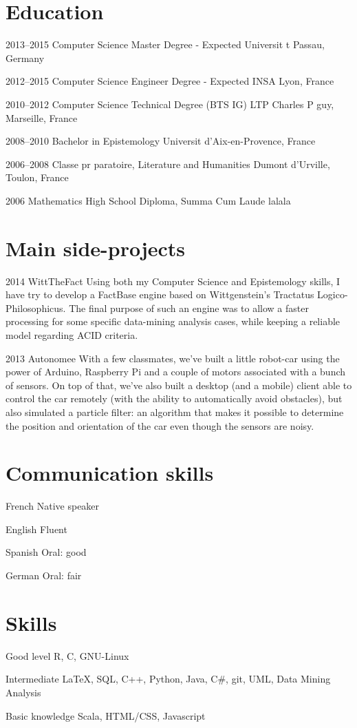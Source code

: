 \documentclass[fontsize=10pt]{tccv}
\begin{document}
\section{Education}
\begin{list}
\item{2013--2015}
     {Computer Science Master Degree - Expected}
     {Universit t Passau, Germany}
\item{2012--2015}
     {Computer Science Engineer Degree - Expected}
     {INSA Lyon, France}
\item{2010--2012}
     {Computer Science Technical Degree (BTS IG)}
     {LTP Charles P guy, Marseille, France}
\item{2008--2010}
     {Bachelor in Epistemology}
     {Universit d'Aix-en-Provence, France}
\item{2006--2008}
     {Classe pr paratoire, Literature and Humanities}
     {Dumont d'Urville, Toulon, France}
\item{2006}
     {Mathematics High School Diploma, Summa Cum Laude}
     {lalala}
\end{list}
\section{Main side-projects}
\begin{list}
\item{2014}
     {WittTheFact}
     {Using both my Computer Science and Epistemology skills, I have try to develop a
     FactBase engine based on Wittgenstein’s Tractatus Logico-Philosophicus.
     The final purpose of such an engine was to allow a faster processing for some specific data-mining analysis cases, while keeping a reliable model regarding ACID criteria.}
\item{2013}
     {Autonomee}
     {With a few classmates, we've built a little robot-car using the power of Arduino, Raspberry Pi and a couple of motors associated with a bunch of sensors. On top of that, we've also built a desktop (and a mobile) client able to control the car remotely (with the ability to automatically avoid obstacles), but also simulated a particle filter: an algorithm that makes it possible to determine the position and orientation of the car even though the sensors are noisy.}
\end{list}
\section{Communication skills}
\begin{factlist}
\item{French}
     {Native speaker}
\item{English}
     {Fluent}
\item{Spanish}
     {Oral: good}
\item{German}
     {Oral: fair}
\end{factlist}
\section{Skills}
\begin{factlist}
\item{Good level}
     {R, C, GNU-Linux}
\item{Intermediate}
     {\LaTeX, SQL, C++, Python, Java, C\#, git, UML, Data Mining Analysis}
\item{Basic knowledge}
     {Scala, HTML/CSS, Javascript}
\end{factlist}
\end{document}
